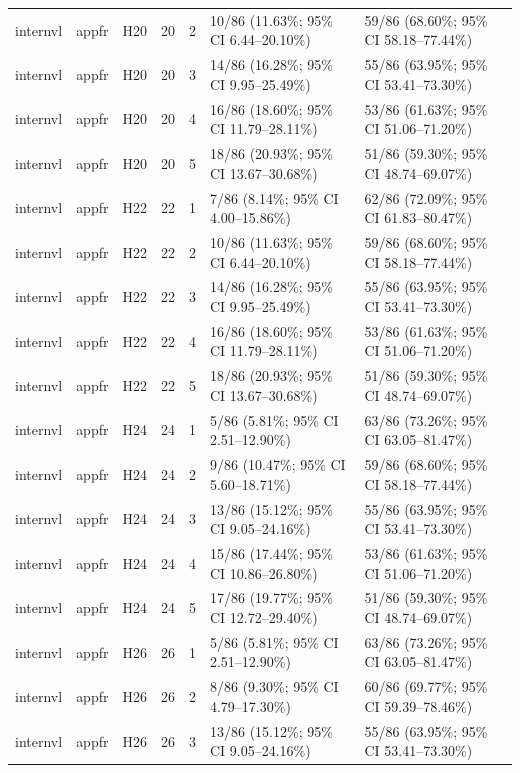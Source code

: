 \begin{longtable}{lllrrll}
internvl & appfr & H20 & 20 & 2 & 10/86 (11.63\%; 95\% CI 6.44–20.10\%) & 59/86 (68.60\%; 95\% CI 58.18–77.44\%) \\
internvl & appfr & H20 & 20 & 3 & 14/86 (16.28\%; 95\% CI 9.95–25.49\%) & 55/86 (63.95\%; 95\% CI 53.41–73.30\%) \\
internvl & appfr & H20 & 20 & 4 & 16/86 (18.60\%; 95\% CI 11.79–28.11\%) & 53/86 (61.63\%; 95\% CI 51.06–71.20\%) \\
internvl & appfr & H20 & 20 & 5 & 18/86 (20.93\%; 95\% CI 13.67–30.68\%) & 51/86 (59.30\%; 95\% CI 48.74–69.07\%) \\
internvl & appfr & H22 & 22 & 1 & 7/86 (8.14\%; 95\% CI 4.00–15.86\%) & 62/86 (72.09\%; 95\% CI 61.83–80.47\%) \\
internvl & appfr & H22 & 22 & 2 & 10/86 (11.63\%; 95\% CI 6.44–20.10\%) & 59/86 (68.60\%; 95\% CI 58.18–77.44\%) \\
internvl & appfr & H22 & 22 & 3 & 14/86 (16.28\%; 95\% CI 9.95–25.49\%) & 55/86 (63.95\%; 95\% CI 53.41–73.30\%) \\
internvl & appfr & H22 & 22 & 4 & 16/86 (18.60\%; 95\% CI 11.79–28.11\%) & 53/86 (61.63\%; 95\% CI 51.06–71.20\%) \\
internvl & appfr & H22 & 22 & 5 & 18/86 (20.93\%; 95\% CI 13.67–30.68\%) & 51/86 (59.30\%; 95\% CI 48.74–69.07\%) \\
internvl & appfr & H24 & 24 & 1 & 5/86 (5.81\%; 95\% CI 2.51–12.90\%) & 63/86 (73.26\%; 95\% CI 63.05–81.47\%) \\
internvl & appfr & H24 & 24 & 2 & 9/86 (10.47\%; 95\% CI 5.60–18.71\%) & 59/86 (68.60\%; 95\% CI 58.18–77.44\%) \\
internvl & appfr & H24 & 24 & 3 & 13/86 (15.12\%; 95\% CI 9.05–24.16\%) & 55/86 (63.95\%; 95\% CI 53.41–73.30\%) \\
internvl & appfr & H24 & 24 & 4 & 15/86 (17.44\%; 95\% CI 10.86–26.80\%) & 53/86 (61.63\%; 95\% CI 51.06–71.20\%) \\
internvl & appfr & H24 & 24 & 5 & 17/86 (19.77\%; 95\% CI 12.72–29.40\%) & 51/86 (59.30\%; 95\% CI 48.74–69.07\%) \\
internvl & appfr & H26 & 26 & 1 & 5/86 (5.81\%; 95\% CI 2.51–12.90\%) & 63/86 (73.26\%; 95\% CI 63.05–81.47\%) \\
internvl & appfr & H26 & 26 & 2 & 8/86 (9.30\%; 95\% CI 4.79–17.30\%) & 60/86 (69.77\%; 95\% CI 59.39–78.46\%) \\
internvl & appfr & H26 & 26 & 3 & 13/86 (15.12\%; 95\% CI 9.05–24.16\%) & 55/86 (63.95\%; 95\% CI 53.41–73.30\%) \\

\end{longtable}
